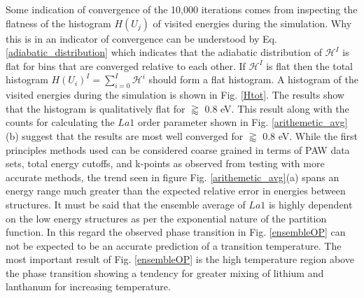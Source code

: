 \documentclass[aps,pre,reprint,superscriptaddress,showkeys]{revtex4-2}
\begin{document}
Some indication of convergence of the 10,000 iterations comes from inspecting the flatness of the histogram $H(U_j)$ of visited energies during the simulation. Why this is in an indicator of convergence can be understood by Eq. \ref{adiabatic_distribution} which indicates that the adiabatic distribution of $\mathcal{H}^I$ is flat for bins that are converged relative to each other. If $\mathcal{H}^I$ is flat then the total histogram $H(U_i)^I=\sum_{i=0}^I\mathcal{H}^i$ should form a flat histogram.   A histogram of the visited energies during the simulation is shown in Fig. \ref{Htot}. The results show that  the histogram is qualitatively flat for $\gtrapprox $ 0.8 eV. This result along with the counts for calculating the $La1$ order parameter shown in Fig. \ref{arithemetic_avg}(b) suggest that the results are most well converged for $\gtrapprox $ 0.8 eV.  While the first principles methods used can be considered coarse grained in terms of PAW data sets, total energy cutoffs, and k-points as observed from testing with more accurate methods, the trend seen in figure Fig. \ref{arithemetic_avg}(a) spans an energy range much greater than the expected relative error in energies between structures. It must be said that the ensemble average of $La1$ is highly dependent on the low energy structures as per the exponential nature of the partition function. In this regard the observed phase transition in Fig. \ref{ensembleOP} can not be expected to be an accurate prediction of a transition temperature. The most important result of Fig. \ref{ensembleOP} is the high temperature region above the phase transition showing a tendency for greater mixing of lithium and lanthanum for increasing temperature. 
\end{document}

